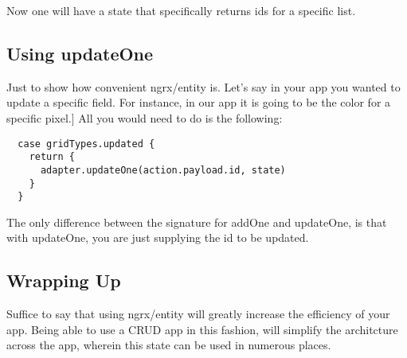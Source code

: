 Now one will have a state that specifically returns ids for a specific list.

\subsection{ Using updateOne }
Just to show how convenient ngrx/entity is. Let's say in your app you wanted to
update a specific field. For instance, in our app it is going to be the color
for a specific pixel.] All you would need to do is the following:
\begin{verbatim}
  case gridTypes.updated {
    return {
      adapter.updateOne(action.payload.id, state)
    }
  }
\end{verbatim}

The only difference between the signature for addOne and updateOne, is that with
updateOne, you are just supplying the id to be updated.

\subsection{ Wrapping Up }
Suffice to say that using ngrx/entity will greatly increase the efficiency of
your app. Being able to use a CRUD app in this fashion, will simplify the
architcture across the app, wherein this state can be used in numerous places.
